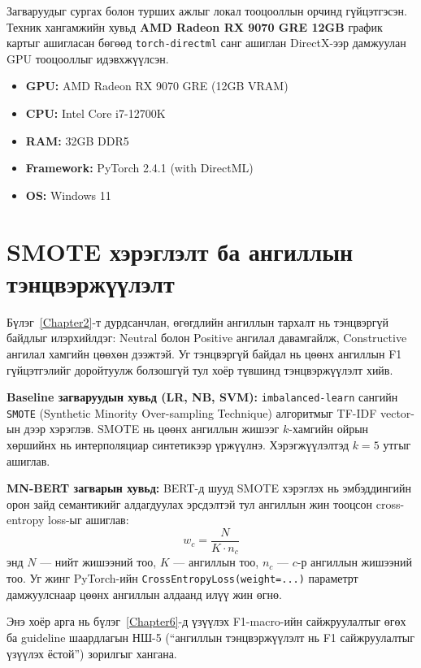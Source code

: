 Загваруудыг сургах болон турших ажлыг локал тооцооллын орчинд гүйцэтгэсэн.
Техник хангамжийн хувьд \textbf{AMD Radeon RX 9070 GRE 12GB} график картыг
ашигласан бөгөөд \texttt{torch-directml} санг ашиглан DirectX-ээр дамжуулан
GPU тооцооллыг идэвхжүүлсэн.

\begin{itemize}
    \item \textbf{GPU:} AMD Radeon RX 9070 GRE (12GB VRAM)
    \item \textbf{CPU:} Intel Core i7-12700K
    \item \textbf{RAM:} 32GB DDR5
    \item \textbf{Framework:} PyTorch 2.4.1 (with DirectML)
    \item \textbf{OS:} Windows 11
\end{itemize}

\section{SMOTE хэрэглэлт ба ангиллын тэнцвэржүүлэлт}

Бүлэг~\ref{Chapter2}-т дурдсанчлан, өгөгдлийн ангиллын тархалт нь тэнцвэргүй
байдлыг илэрхийлдэг: Neutral болон Positive ангилал давамгайлж, Constructive
ангилал хамгийн цөөхөн дээжтэй. Уг тэнцвэргүй байдал нь цөөнх ангиллын F1
гүйцэтгэлийг доройтуулж болзошгүй тул хоёр түвшинд тэнцвэржүүлэлт хийв.

\textbf{Baseline загваруудын хувьд (LR, NB, SVM):} \texttt{imbalanced-learn}
сангийн \texttt{SMOTE} (Synthetic Minority Over-sampling Technique) алгоритмыг
TF-IDF vector-ын дээр хэрэглэв. SMOTE нь цөөнх ангиллын жишээг $k$-хамгийн
ойрын хөршийнх нь интерполяциар синтетикээр үржүүлнэ. Хэрэгжүүлэлтэд
$k\!=\!5$ утгыг ашиглав.

\textbf{MN-BERT загварын хувьд:} BERT-д шууд SMOTE хэрэглэх нь эмбэддингийн
орон зайд семантикийг алдагдуулах эрсдэлтэй тул ангиллын жин тооцсон
cross-entropy loss-ыг ашиглав:
\[
  w_c = \frac{N}{K \cdot n_c}
\]
энд $N$ --- нийт жишээний тоо, $K$ --- ангиллын тоо, $n_c$ --- $c$-р
ангиллын жишээний тоо. Уг жинг PyTorch-ийн \texttt{CrossEntropyLoss(weight=...)}
параметрт дамжуулснаар цөөнх ангиллын алдаанд илүү жин өгнө.

Энэ хоёр арга нь бүлэг~\ref{Chapter6}-д үзүүлэх F1-macro-ийн сайжруулалтыг
өгөх ба guideline шаардлагын НШ-5 (``ангиллын тэнцвэржүүлэлт нь F1 сайжруулалтыг
үзүүлэх ёстой'') зорилгыг хангана.

